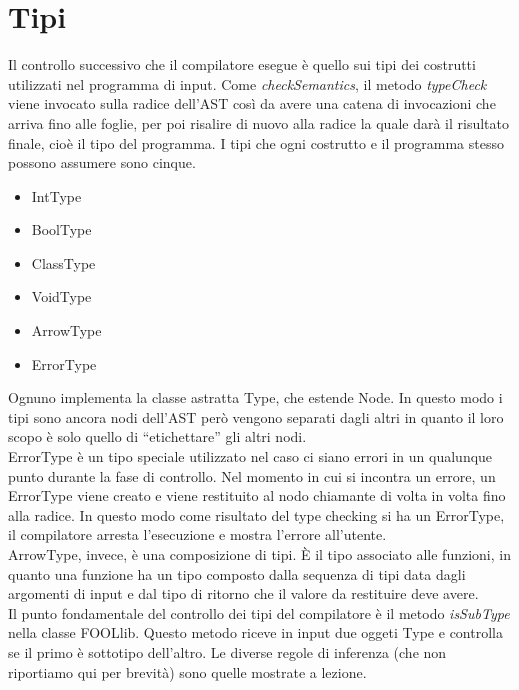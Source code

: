 \documentclass{scrreprt}
\begin{document}
\section{Tipi}
Il controllo successivo che il compilatore esegue è quello sui tipi dei costrutti utilizzati nel programma di input. Come \textit{checkSemantics}, il metodo \textit{typeCheck} viene invocato sulla
radice dell'AST così da avere una catena di invocazioni che arriva fino alle foglie, per poi risalire di nuovo alla radice la quale darà il risultato finale, cioè il tipo del programma. 
I tipi che ogni costrutto e il programma stesso possono assumere sono cinque.

\begin{itemize}
    \item IntType
    \item BoolType
    \item ClassType
    \item VoidType
    \item ArrowType
    \item ErrorType
\end{itemize}

Ognuno implementa la classe astratta Type, che estende Node. In questo modo i tipi sono ancora nodi dell'AST però vengono separati dagli altri in quanto il loro scopo è solo quello
di ``etichettare'' gli altri nodi.\\

ErrorType è un tipo speciale utilizzato nel caso ci siano errori in un qualunque punto durante la fase di controllo. Nel momento in cui si incontra un errore,
un ErrorType viene creato e viene restituito al nodo chiamante di volta in volta fino alla radice. In questo modo come risultato del type checking si ha un ErrorType, il compilatore
arresta l'esecuzione e mostra l'errore all'utente.\\

ArrowType, invece, è una composizione di tipi. È il tipo associato alle funzioni, in quanto una funzione ha un tipo composto dalla sequenza di tipi data dagli argomenti di input e dal tipo di ritorno che il valore da restituire deve avere.\\

Il punto fondamentale del controllo dei tipi del compilatore è il metodo \textit{isSubType} nella classe FOOLlib. Questo metodo riceve in input
due oggeti Type e controlla se il primo è sottotipo dell'altro. Le diverse regole di inferenza (che non riportiamo qui per brevità) sono quelle mostrate a lezione.
\end{document}
